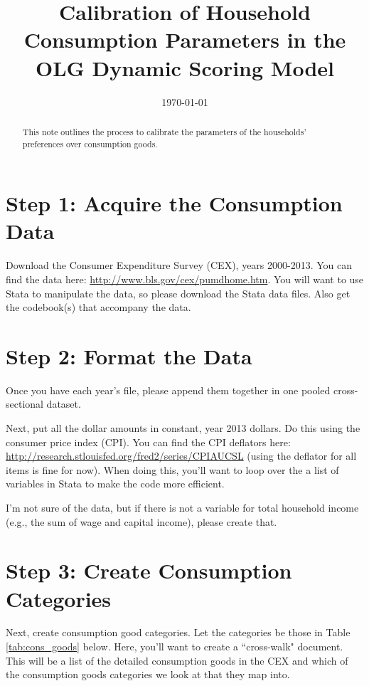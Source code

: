 \documentclass[article,11pt,letterpaper,fleqn]{article}
\title{Calibration of Household Consumption Parameters in the OLG Dynamic Scoring Model}
\date{\today}
\theoremstyle{definition}
\numberwithin{equation}{section}
\begin{document}

\maketitle



\begin{abstract}
This note outlines the process to calibrate the parameters of the households' preferences over consumption goods.
\end{abstract}

\section*{Step 1: Acquire the Consumption Data}
\label{sec:step1}

Download the Consumer Expenditure Survey (CEX), years 2000-2013.  You can find the data here: \href{http://www.bls.gov/cex/pumdhome.htm}{http://www.bls.gov/cex/pumdhome.htm}.  You will want to use Stata to manipulate the data, so please download the Stata data files.  Also get the codebook(s) that accompany the data.

\section*{Step 2: Format the Data}
\label{sec:step2}

Once you have each year's file, please append them together in one pooled cross-sectional dataset.  

Next, put all the dollar amounts in constant, year 2013 dollars.  Do this using the consumer price index (CPI).  You can find the CPI deflators here: \\ \href{http://research.stlouisfed.org/fred2/series/CPIAUCSL}{http://research.stlouisfed.org/fred2/series/CPIAUCSL} (using the deflator for all items is fine for now).  When doing this, you'll want to loop over the a list of variables in Stata to make the code more efficient.

I'm not sure of the data, but if there is not a variable for total household income (e.g., the sum of wage and capital income), please create that.

\section*{Step 3: Create Consumption Categories}
\label{sec:step3}

Next, create consumption good categories.  Let the categories be those in Table \ref{tab:cons_goods} below.  Here, you'll want to create a ``cross-walk" document.  This will be a list of the detailed consumption goods in the CEX and which of the consumption goods categories we look at that they map into.
\end{document}
